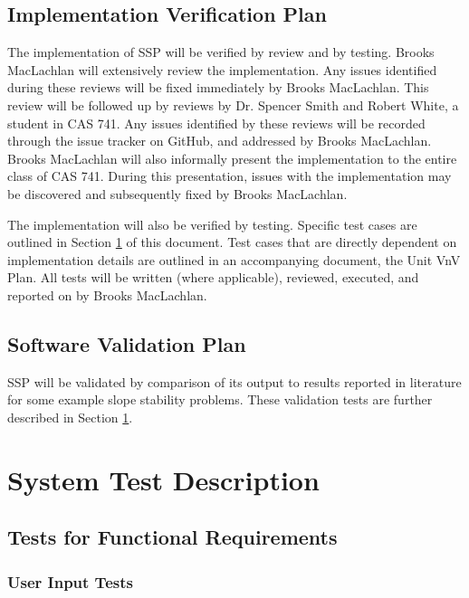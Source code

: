 \documentclass[12pt, titlepage]{article}
\begin{document}
\subsection{Implementation Verification Plan} \label{sec_ImpPlan}

\noindent The implementation of SSP will be verified by review and by testing. 
Brooks MacLachlan will extensively review the implementation. Any issues 
identified during these reviews will be fixed immediately by Brooks 
MacLachlan. This review will be followed up by reviews by Dr. Spencer Smith and 
Robert White, a student in CAS 741. Any  issues identified by these reviews 
will be recorded through the issue tracker on GitHub, and addressed by Brooks 
MacLachlan. Brooks MacLachlan will also informally present the implementation 
to the entire class of CAS 741. During this presentation, issues with the 
implementation may be discovered and subsequently fixed by Brooks MacLachlan.
\newline

\noindent The implementation will also be verified by testing. Specific test 
cases are outlined in Section \ref{sec_System} of this document. Test cases 
that are directly dependent on implementation details are outlined in an 
accompanying document, the Unit VnV Plan. All tests will be written (where 
applicable), reviewed, executed, and reported on by Brooks MacLachlan.

\subsection{Software Validation Plan}

SSP will be validated by comparison of its output to results reported in 
literature for some example slope stability problems. These validation tests 
are further described in Section \ref{sec_System}.

\section{System Test Description} \label{sec_System}
	
\subsection{Tests for Functional Requirements}

\subsubsection{User Input Tests}
		
\end{document}
